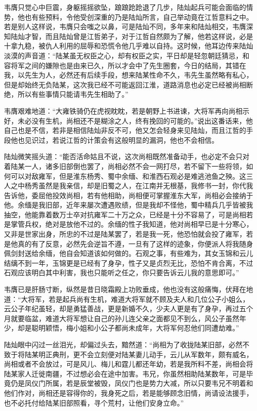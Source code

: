 韦膺只觉心中巨震，身躯摇摇欲坠，踉踉跄跄退了几步，陆灿起兵可能会面临的情势，他也有些预料，令他受创深重的乃是陆灿所言，自己举动竟在江哲意料之中。若是别人这样说，韦膺只会嗤之以鼻，可是陆灿不同，多年来和陆灿相交，韦膺深知陆灿才智，而且陆灿曾是江哲弟子，对于江哲自然颇为了解，他若这样说，必是十拿九稳，被仇人利用的屈辱和恐慌令他几乎难以自持。这时候，他耳边传来陆灿淡漠的声音道：“陆某虽无权臣之心，却有权臣之实，平日却是轻忽朝廷猜忌，和容将军之间的嫌隙也是由来已久，所以才会中了先生圈套，今日的结局，其错在我，以先生为人，必然还有后续手段，想来陆某性命不久，韦先生虽然略有私心，但是却始终无负陆某，这次我已经不可能返回江淮，道路消息也必定已经被尚相断绝，所以有些事情只能请韦先生相助了。”

韦膺艰难地道：“大雍铁骑仍在虎视眈眈，若是朝野上书进谏，大将军再向尚相示好，未必没有生机，尚相还不是糊涂之人，终有挽回的可能的。”说出这番话来，他自己也是不信，若非是相信陆灿非反不可，他又怎会轻身来见陆灿，而且江哲的手段他也见识过，若说江哲的计策会有这般明显的漏洞，他也不会相信。

陆灿微笑摇头道：“能否活命姑且不说，这次尚相既然准备动手，也必定不会只对着陆某一人，诸多旧部倒也罢了，尚相必然不会一网打尽，若不留下一些将领，如何可以对敌雍军，但是淮东杨秀、蜀中余缅、和淮西石观必是难逃池鱼之殃。这三人之中杨秀虽然是我亲信，却是旧蜀之人，在江南并无根基，我修书一封，你代我告诉他，委屈他投效尚相，若有他相助，尚相便可掌握淮东大军，尚相必会接纳于他。余缅是我旧部，近年来屡次遭遇败绩，但是我却不怪他，蜀中精兵几乎皆被我抽空，他能靠着数万士卒对抗雍军二十万之众，已经是十分不容易了，可是尚相若是掌管兵权，绝对是放他不过的。余缅的性子我知道，他对尚相早已是十分寒心，又非是世家出身，所忠的不过是陆某罢了，若是我一死，他恐怕就会投了雍军，若是他真的有了反意，必然先会逆旨不遵，一旦有了这样的迹象，你便派人将我随身佩剑封送给余缅，他自会知道该如何做的。石观之事，有些难为，其女玉锦和云儿结缡不到一年，玉锦更是已经有了身孕，性子又是贞烈无比，恐怕不肯合离，不过石观应该明白其中利害，我也只能听之任之，你只要告诉云儿我的意思即可。”

韦膺已是肝肠寸断，纵然是昔日晓霜殿上功败垂成，他也没有这般痛悔，伏拜在地道：“大将军，若是起兵尚有生机，难道大将军就不顾及夫人和几位公子小姐么，云公子年纪虽轻，却是勇猛善战，更是新婚不久，少夫人更是有了身孕，再过五个月就要临盆，难道大将军想让自己的孙儿连父亲之面都见不到么，风公子虽然年少，却是聪明颖悟，梅小姐和小公子都尚未成年，大将军何忍他们同遭劫难。”

陆灿眼中闪过一丝泪光，却偏过头去，黯然道：“尚相为了收拢陆某旧部，必然不致于将陆某明正典刑，更不会立刻便对陆某妻儿动手，云儿从军数年，颇有威名，尚相或者不会放过，可是风儿、梅儿和霆儿都还年幼，若是我所料不差，尚相会将陆某家人迁徙南疆，不过想必会在途中加害。韦兄，你虽然相助陆某数年，可是毕竟仍是凤仪门所属，若是辰堂被毁，凤仪门也是势力大减，所以只要韦兄不明着和他们作对，尚相还是容得你的，我身死之后，若是能够顾念旧情，尚请设法援手，也不必托付给陆某旧部照看，寻个荒村，让他们安身立命。”

